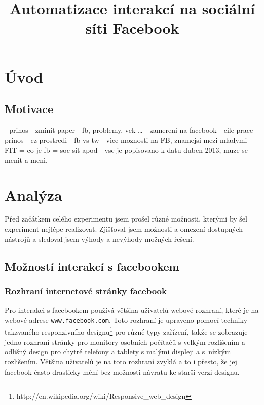 \documentclass[thesis=M,czech]{FITthesis}[2013/05/10]
\title{Automatizace interakcí na sociální síti Facebook}
\begin{document}


\chapter{{\' U}vod}
\section{Motivace}
- prinos
- zminit paper
- fb, problemy, vek …
- zamereni na facebook
- cile prace
- prinos
- cz prostredi
- fb vs tw - vice moznosti na FB, znamejsi mezi mladymi
FIT
= co je fb = soc sit apod
- vse je popisovano k datu duben 2013, muze se menit a meni,



\chapter{Analýza}

Před začátkem celého experimentu jsem prošel různé možnosti, kterými by šel experiment nejlépe realizovat. Zjišťoval jsem možnosti a omezení dostupných nástrojů a sledoval jsem výhody a nevýhody možných řešení. 

\section{Možností interakcí s facebookem}

\subsection{Rozhraní internetové stránky facebook}
Pro interakci s facebookem používá většina uživatelů webové rozhraní, které je na webové adrese \verb|www.facebook.com|. Toto rozhraní je upraveno pomocí techniky takzvaného responzivního designu\footnote{http://en.wikipedia.org/wiki/Responsive\_web\_design} pro různé typy zařízení, takže se zobrazuje jedno rozhraní stránky pro monitory osobních počítačů s velkým rozlišením a odlišný design pro chytré telefony a tablety s malými displeji a s~nízkým rozlišením. Většina uživatelů je na toto rozhraní zvyklá a to i přesto, že jej facebook často drasticky mění bez možnosti návratu ke starší verzi designu. 
\end{document}
